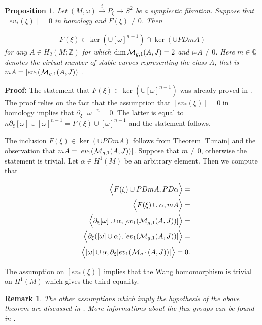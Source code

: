 \documentclass[a4paper,14pt]{article}
\newcommand{\B}[1]{\mathbb #1}
\newcommand{\C}[1]{{\cal #1}}
\newcommand{\al}{{\alpha}}
\newcommand{\om}{{\omega}}
\newcommand{\qed}{\rightline {$\Box $}}
\newcommand{\map}[1]{\stackrel {#1}\longrightarrow}
\newcommand{\Mo}{(M,\omega )}
\newcommand{\pf}{\NI {\bf Proof: }}
\newcommand{\BS}{{\bigskip}}
\newcommand{\NI}{{\noindent}}
\newtheorem{rem}[theorem]{Remark}
\newtheorem{prop}[theorem]{Proposition}
\numberwithin{equation}{section}
\begin{document}
\begin{prop}\label{P:flux}
Let $\Mo \map{i} P_{\xi } \to S^2$ be a symplectic fibration.
Suppose that $[ev_*(\xi )]=0$ in homology and $F(\xi )\neq 0$.
Then

$$F(\xi )\in \ker (\cup [\om ]^{n-1})
\cap \ker (\cup PDmA)$$
for any  $A\in H_2(M;\B Z)$ for which 
$\dim \C M_{g,1}(A,J)=2$ and $i_*A\neq 0$.
Here $m\in \B Q$ denotes the virtual number of stable
curves representing the class $A$, that is
$mA = [ev_1(\C M_{g,1}(A,J))]$.
\end{prop}


\pf The statement that $F(\xi)\in \ker (\cup [\om ]^{n-1})$
was already proved in \cite{k}. The proof relies on the fact that
the assumption that $[ev_*(\xi )]=0$ in homology implies
that $\partial _{\xi }[\om ]^n = 0$. The latter is equal
to $n \partial _{\xi }[\om ]\cup [\om ]^{n-1} =
F(\xi )\cup [\om ]^{n-1}$ and the statement follows.


The inclusion 
$F(\xi )\in \ker (\cup  PDmA)$
follows from Theorem \ref{T:main} and the observation
that $mA = [ev_1(\C M_{g,1}(A,J))]$. Suppose that 
$m\neq 0$, otherwise the statement is trivial. 
Let $\al \in H^1(M)$ be an arbitrary element. Then
we compute that

\begin{eqnarray*}
&&\Big <F(\xi )\cup PD mA, PD \al \Big>=\\
&&\Big <F(\xi )\cup \al,mA\Big >=\\
&&\Big <\partial _{\xi } [\om ]\cup \al,[ev_1 (\C M_{g,1}(A,J))]\Big >=\\
&&\Big <\partial _{\xi }([\om ]\cup \al ),[ev_1 (\C M_{g,1}(A,J))]\Big >=\\
&&\Big <[\om ]\cup \al,\partial _{\xi }[ev_1 (\C M_{g,1}(A,J))]\Big >=0.
\end{eqnarray*}


\noindent
The assumption on $[ev_*(\xi )]$ implies that the Wang
homomorphism is trivial on $H^1(M)$ which gives the
third equality. 

\qed


\BS

\begin{rem}
The  other assumptions which imply
the hypothesis of the above theorem are discussed in \cite{k}. 
More informations about the
flux groups can be found in \cite{lmp1}.
\end{rem}
\end{document}
